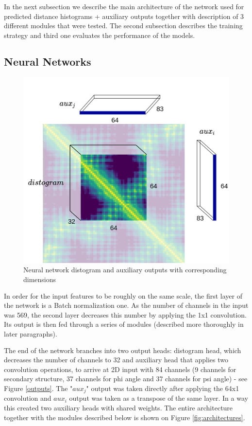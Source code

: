 In the next subsection we describe the main architecture of the network used for predicted distance histograms + auxiliary outputs together with description of 3 different modules that were tested. The second subsection describes the training strategy and third one evaluates the performance of the models.

\subsection{Neural Networks}

\begin{figure}
    \centering
    \includegraphics[width=0.7\linewidth]{imgs_tomas/outputs.png}
    \caption{Neural network distogram and auxiliary outputs with corresponding dimensions}
    \label{fig:outputs}
\end{figure}

In order for the input features to be roughly on the same scale, the first layer of the network is a Batch normalization one. As the number of channels in the input was 569, the second layer decreases this number by applying the 1x1 convolution. Its output is then fed through a series of modules (described more thoroughly in later paragraphs).

The end of the network branches into two output heads: distogram head, which decreases the number of channels to 32 and auxiliary head that applies two convolution operations, to arrive at 2D input with 84 channels (9 channels for secondary structure, 37 channels for phi angle and 37 channels for psi angle) - see Figure \ref{outputs}. The "$aux_j$" output was taken directly after applying the 64x1 convolution and $aux_i$ output was taken as a transpose of the same layer. In a way this created two auxiliary heads with shared weights. The entire architecture together with the modules described below is shown on Figure \ref{fig:architectures}.


